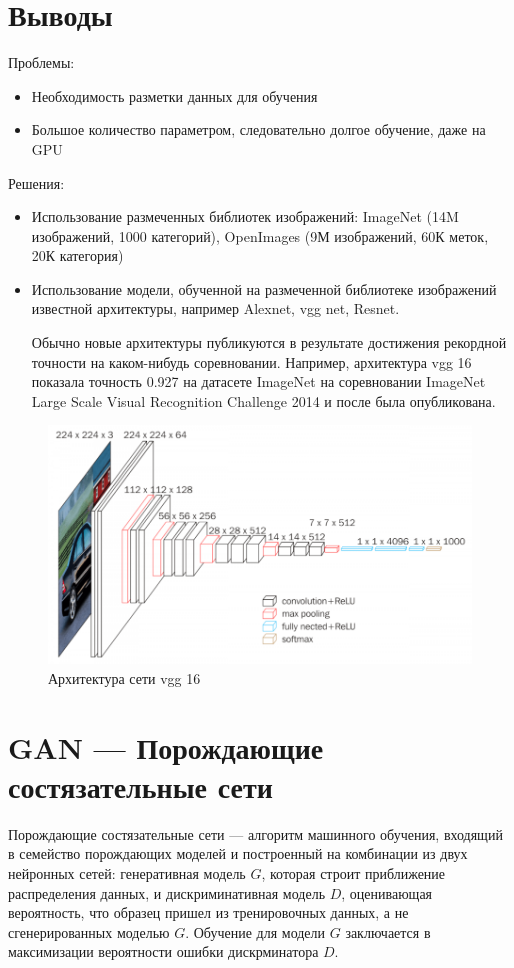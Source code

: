 \documentclass{article}
\theoremstyle{definition}
\theoremstyle{theorem}
\theoremstyle{remark}
\theoremstyle{theorem}
\theoremstyle{example}
\theoremstyle{theorem}
\theoremstyle{theorem}
\theoremstyle{theorem}
\theoremstyle{theorem}
\begin{document}
	\section{Выводы}
		Проблемы:
		\begin{itemize}
			\item Необходимость разметки данных для обучения
			\item Большое количество параметром, следовательно долгое обучение, даже на GPU
		\end{itemize}
	Решения:
		\begin{itemize}
			\item Использование размеченных библиотек изображений: ImageNet (14M изображений, 1000 категорий), OpenImages (9М изображений, 60К меток, 20К категория)
			\item Использование модели, обученной на размеченной библиотеке изображений известной архитектуры, например Alexnet, vgg net, Resnet. 
			
		Обычно новые архитектуры публикуются в результате достижения рекордной точности на каком-нибудь соревновании. Например, архитектура vgg 16 показала точность 0.927 на датасете ImageNet на соревновании ImageNet Large Scale Visual Recognition Challenge 2014 и после была опубликована.
		\end{itemize}
		\newpage
		\begin{figure}[h!]
			\includegraphics[width=\textwidth]{img/vgg16.png}\caption{Архитектура сети vgg 16}
		\end{figure}
		
		
\section{GAN --- Порождающие состязательные сети}

Порождающие состязательные сети --- алгоритм машинного обучения, входящий в семейство порождающих моделей и построенный на комбинации из двух нейронных сетей: генеративная модель $G$, которая строит приближение распределения данных, и дискриминативная модель $D$, оценивающая вероятность, что образец пришел из тренировочных данных, а не сгенерированных моделью $G$. Обучение для модели $G$ заключается в максимизации вероятности ошибки дискрминатора $D$.
\end{document}
